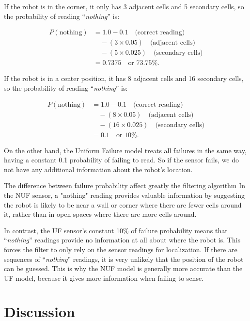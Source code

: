 \documentclass{article}
\begin{document}
If the robot is in the corner, it only has 3 adjacent cells and 5 secondary cells, so the probability of reading ``\textit{nothing}'' is:

\begin{align*}
    P(\text{nothing}) &= 1.0 - 0.1 \quad \text{(correct reading)} \\
    &\quad - (3 \times 0.05) \quad \text{(adjacent cells)} \\
    &\quad - (5 \times 0.025) \quad \text{(secondary cells)} \\
    &= 0.7375 \quad \text{or } 73.75\%.
\end{align*}

If the robot is in a center position, it has 8 adjacent cells and 16 secondary cells, so the probability of reading ``\textit{nothing}'' is:

\begin{align*}
    P(\text{nothing}) &= 1.0 - 0.1 \quad \text{(correct reading)} \\
    &\quad - (8 \times 0.05) \quad \text{(adjacent cells)} \\
    &\quad - (16 \times 0.025) \quad \text{(secondary cells)} \\
    &= 0.1 \quad \text{or } 10\%.
\end{align*}

On the other hand, the Uniform Failure model treats all failures in the same way, having a constant 0.1 probability of failing to read. So if the sensor fails, we do not have any additional information about the robot's location.

The difference between failure probability affect greatly the filtering algorithm
In the NUF sensor, a "nothing" reading provides valuable information by suggesting the robot is likely to be near a wall or corner where there are fewer cells around it, rather than in open spaces where there are more cells around.

In contrast, the UF sensor’s constant 10\% of failure probability means that ``\textit{nothing}'' readings provide no information at all about where the robot is. This forces the filter to only rely on the sensor readings for localization. If there are sequences of ``\textit{nothing}'' readings, it is very unlikely that the position of the robot can be guessed. This is why the NUF model is generally more accurate than the UF model, because it gives more information when failing to sense.

\section*{Discussion}
\end{document}
